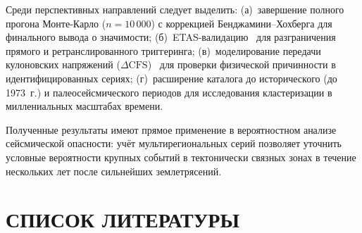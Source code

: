 \documentclass[12pt,a4paper]{article}
\begin{document}
Среди перспективных направлений следует выделить:
(а)~завершение полного прогона Монте-Карло ($n=10\,000$) с коррекцией
Бенджамини--Хохберга для финального вывода о значимости;
(б)~ETAS-валидацию~\cite{Ogata1988} для разграничения прямого и ретранслированного
триггеринга;
(в)~моделирование передачи кулоновских напряжений ($\Delta\mathrm{CFS}$)~\cite{King1994}
для проверки физической причинности в идентифицированных сериях;
(г)~расширение каталога до исторического (до 1973~г.) и палеосейсмического
периодов для исследования кластеризации в миллениальных масштабах времени.

Полученные результаты имеют прямое применение в вероятностном анализе
сейсмической опасности: учёт мультирегиональных серий позволяет уточнить
условные вероятности крупных событий в тектонически связных зонах в течение
нескольких лет после сильнейших землетрясений.

\vspace{0.6cm}

\section*{СПИСОК ЛИТЕРАТУРЫ}
\end{document}
